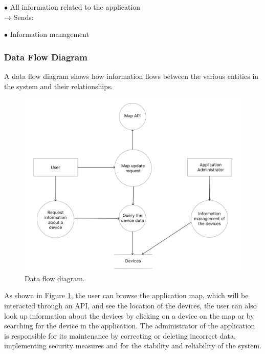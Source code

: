 $\bullet$ All information related to the application\\
\newline
→ Sends:

$\bullet$ Information management

\subsubsection{Data Flow Diagram}

A data flow diagram shows how information flows between the various entities
in the system and their relationships.

\begin{figure}[H]
    \centering
    \includegraphics[width=15cm]{../app/docs/software_requirements/assets/images/data_flow_diagram.png}
    \caption{Data flow diagram.}
    \label{fig:data flow diagram}
\end{figure}

As shown in Figure \ref{fig:data flow diagram}, the user can browse the application
map, which will be interacted through an API,
and see the location of the \hyperlink{\acronym}{\acronym} devices, the user can also look up information
about the devices by clicking on a device on the map or by searching for
the device in the application. The administrator of the application is responsible for
its maintenance by correcting or deleting incorrect data, implementing security
measures and for the stability and reliability of the system.

